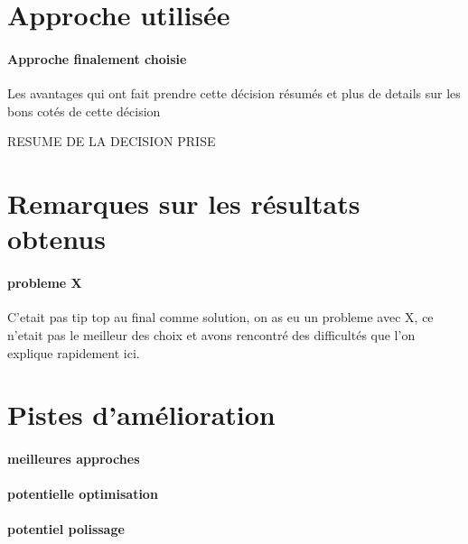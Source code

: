 	\section{Approche utilisée}
	
		\paragraph{Approche finalement choisie}
		Les avantages qui ont fait prendre cette décision résumés et plus de details sur les bons cotés de cette décision
	
		\begin{result}
			RESUME DE LA DECISION PRISE
		\end{result}
		
	\section{Remarques sur les résultats obtenus}
	
		\paragraph{probleme X}
		C'etait pas tip top au final comme solution, on as eu un probleme avec X, ce n'etait pas le meilleur des choix et avons rencontré des difficultés que l'on explique rapidement ici.
		
	\section{Pistes d'amélioration}
	
		\paragraph{meilleures approches}
		
		\paragraph{potentielle optimisation}
		
		\paragraph{potentiel polissage}